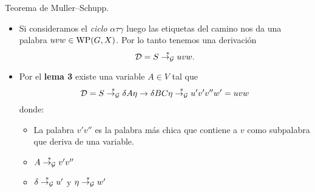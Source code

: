 \documentclass[aspectratio=169, 10pt]{beamer}
\begin{document}
	\begin{frame}[fragile]{Teorema de Muller--Schupp.}
		\begin{itemize}
			\item Si consideramos el \emph{ciclo} $\alpha \tau \gamma$ luego las etiquetas del camino nos da una palabra $uvw \in \text{WP}(G, X)$.
			Por lo tanto tenemos una derivación
			\[
				{\cal D} = S \overset{*}{\to_{\cal G}} uvw.
			\]

			\item Por el \textbf{lema 3} existe una variable $A \in V$ tal que
			\[
				{\cal D} = S \overset{*}{\to_{\cal G}} \delta A \eta \to \delta BC \eta \overset{*}{\to_{\cal G}} u'v'v''w' = uvw
			\]
			donde:
			\begin{itemize}
				\item La palabra $v'v''$ es la palabra más chica que contiene a $v$ como subpalabra que deriva de una variable.
				\item $A \overset{*}{\to_{\cal G}} v'v''$
				\item $\delta \overset{*}{\to_{\cal G}} u'$ y $\eta \overset{*}{\to_{\cal G}} w'$
			\end{itemize} 
			
		\end{itemize}
	\end{frame}
	
\end{document}
